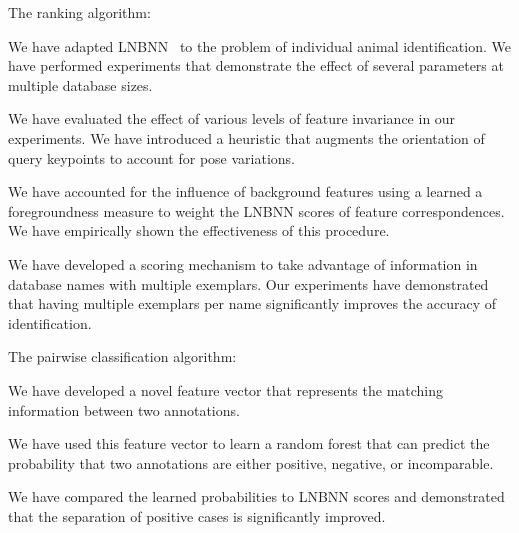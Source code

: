    \begin{enumln}
    \item {The ranking algorithm}:
        \begin{enumln}
        \item
        We have adapted LNBNN~\cite{mccann_local_2012} to the problem of individual animal identification.
        We have performed experiments that demonstrate the effect of several parameters at multiple database
          sizes.

        \item
        We have evaluated the effect of various levels of feature invariance in our experiments.
        We have introduced a heuristic that augments the orientation of query keypoints to account for pose
          variations.

        \item
        We have accounted for the influence of background features using a learned a foregroundness measure to
          weight the LNBNN scores of feature correspondences.
        We have empirically shown the effectiveness of this procedure.

        \item
        We have developed a \name{} scoring mechanism to take advantage of information in database names with
          multiple exemplars.
        Our experiments have demonstrated that having multiple exemplars per name significantly improves the
          accuracy of identification.
        \end{enumln}

    \item {The pairwise classification algorithm}:
        \begin{enumln}

        \item We have developed a novel feature vector that represents the matching information between two
          annotations.

        \item We have used this feature vector to learn a random forest that can predict the probability that two
          annotations are either positive, negative, or incomparable.

        \item We have compared the learned probabilities to LNBNN scores and demonstrated that the separation of
          positive cases is significantly improved.
        \end{enumln}


\end{enumln}
